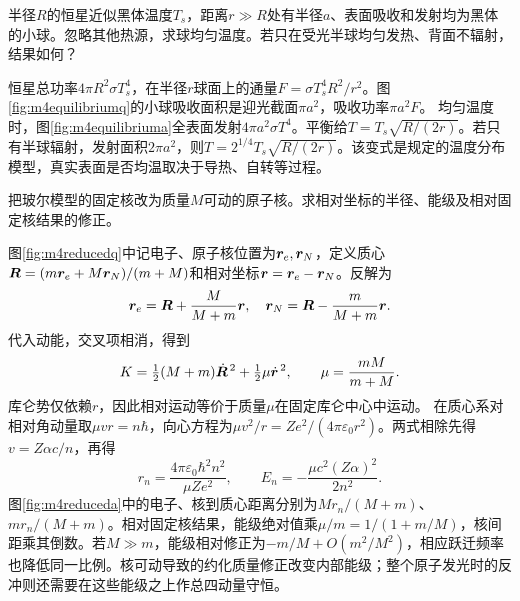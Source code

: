 \begin{exercise}\label{ex:m4equilibrium}
半径$R$的恒星近似黑体温度$T_s$，距离$r\gg R$处有半径$a$、表面吸收和发射均为黑体的小球。忽略其他热源，求球均匀温度。若只在受光半球均匀发热、背面不辐射，结果如何？
\end{exercise}
\begin{solution}
恒星总功率$4\pi R^2\sigma T_s^4$，在半径$r$球面上的通量$F=\sigma T_s^4R^2/r^2$。图\ref{fig:m4equilibriumq}的小球吸收面积是迎光截面$\pi a^2$，吸收功率$\pi a^2F$。
均匀温度时，图\ref{fig:m4equilibriuma}全表面发射$4\pi a^2\sigma T^4$。平衡给$T=T_s\sqrt{R/(2r)}$。若只有半球辐射，发射面积$2\pi a^2$，则$T=2^{1/4}T_s\sqrt{R/(2r)}$。该变式是规定的温度分布模型，真实表面是否均温取决于导热、自转等过程。
\end{solution}

\begin{exercise}\label{ex:m4reducedmass}
把玻尔模型的固定核改为质量$M$可动的原子核。求相对坐标的半径、能级及相对固定核结果的修正。
\end{exercise}
\begin{solution}
图\ref{fig:m4reducedq}中记电子、原子核位置为$\bm{r}_e,\bm{r}_N$，定义质心$\bm{R}=(m\bm{r}_e+M\bm{r}_N)/(m+M)$和相对坐标$\bm{r}=\bm{r}_e-\bm{r}_N$。反解为
\[
 \bm{r}_e=\bm{R}+\frac M{M+m}\bm{r},\quad
 \bm{r}_N=\bm{R}-\frac m{M+m}\bm{r}.
\]
代入动能，交叉项相消，得到
\[
 K=\tfrac12(M+m)\dot{\bm{R}}^{\,2}
 +\tfrac12\mu\dot{\bm{r}}^{\,2},\qquad \mu=\frac{mM}{m+M}.
\]
库仑势仅依赖$r$，因此相对运动等价于质量$\mu$在固定库仑中心中运动。
在质心系对相对角动量取$\mu vr=n\hbar$，向心方程为$\mu v^2/r=Ze^2/(4\pi\varepsilon_0r^2)$。两式相除先得$v=Z\alpha c/n$，再得
\[
 r_n=\frac{4\pi\varepsilon_0\hbar^2n^2}{\mu Ze^2},\qquad
 E_n=-\frac{\mu c^2(Z\alpha)^2}{2n^2}.
\]
图\ref{fig:m4reduceda}中的电子、核到质心距离分别为$Mr_n/(M+m)$、$mr_n/(M+m)$。相对固定核结果，能级绝对值乘$\mu/m=1/(1+m/M)$，核间距乘其倒数。若$M\gg m$，能级相对修正为$-m/M+O(m^2/M^2)$，相应跃迁频率也降低同一比例。核可动导致的约化质量修正改变内部能级；整个原子发光时的反冲则还需要在这些能级之上作总四动量守恒。
\end{solution}

